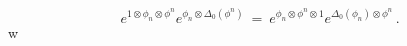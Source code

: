 \begin{equation}
e^{1\otimes \phi_n\otimes \phi^n} e^{\phi_n\otimes
\Delta_0(\phi^n)} \ = \ e^{\phi_n\otimes \phi^n\otimes 1}
e^{\Delta_0(\phi_n)\otimes \phi^n}\,
.\label{r354}\end{equation}w
